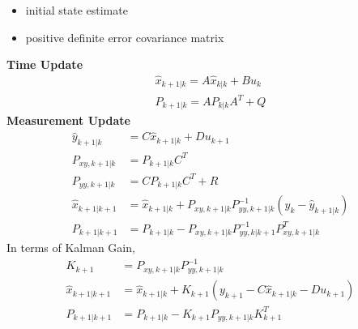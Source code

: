 \documentclass[12pt,a4paper]{article}
\begin{document}
	\begin{itemize}
		\item { initial state estimate}
		\item { positive definite error covariance matrix}
	\end{itemize}
	\textbf{Time Update} \\
	\begin{equation}
		\begin{split}
			\hat{x}_{k+1|k} = A\hat{x}_{k|k} + Bu_k \\
			P_{k+1|k} = AP_{k|k}A^T + Q
		\end{split}
		\label{eq2}
	\end{equation}
	\textbf{Measurement Update} \\
	\begin{equation}
		\begin{split}
			\hat{y}_{k+1|k} &= C\hat{x}_{k+1|k} + Du_{k+1} \\
			P_{xy,k+1|k} &= P_{k+1|k}C^T  \\
			P_{yy,k+1|k} &= CP_{k+1|k}C^T + R \\
			\hat{x}_{k+1|k+1} &= \hat{x}_{k+1|k} + P_{xy,k+1|k}P^{-1}_{yy,k+1|k}(y_k - \hat{y}_{k+1|k}) \\
			P_{k+1|k+1} &= P_{k+1|k} - P_{xy,k+1|k}P^{-1}_{yy,k|k+1}P^T_{xy,k+1|k}
		\end{split}
		\label{eq3}
	\end{equation}
	In terms of Kalman Gain,
	\begin{equation}
		\begin{split}
			K_{k+1} &= P_{xy,k+1|k}P^{-1}_{yy,k+1|k}\\
			\hat{x}_{k+1|k+1} &= \hat{x}_{k+1|k} + K_{k+1}(y_{k+1} - C\hat{x}_{k+1|k} - Du_{k+1}) \\
			P_{k+1|k+1} &= P_{k+1|k} - K_{k+1} P_{yy,k+1|k}K^T_{k+1}
		\end{split}
		\label{eq4}
	\end{equation}
\end{document}
